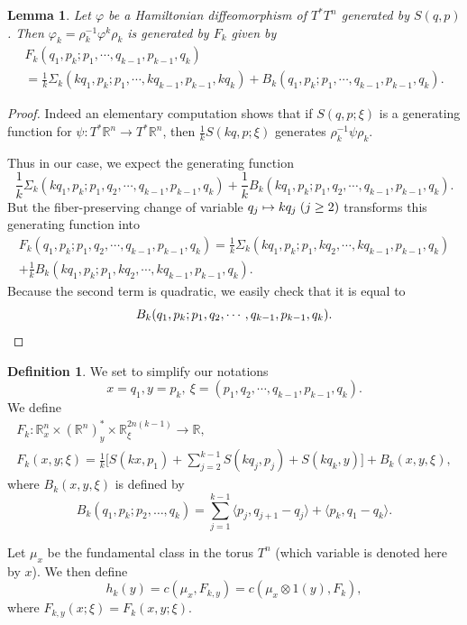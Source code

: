 \documentclass[JEP,XML,SOM,NoFloatCountersInSection,Unicode,published]{cedram}
\newcommand\mto{\mathchoice{\longmapsto}{\mapsto}{\mapsto}{\mapsto}}
\numberwithin{equation}{section}
\theoremstyle{plain}
\newtheorem{lemma}[theorem]{Lemma}
\theoremstyle{definition}
\newtheorem{definition}[theorem]{Definition}
\theoremstyle{remark}
\begin{document}
\begin{lemma}\label{Lemma-5.7}
Let $\varphi$ be a Hamiltonian diffeomorphism of $T^*T^n$ generated by $S(q,p)$. Then $\varphi_{k} =
\rho_{k}^{-1} \varphi^{k} \rho_{k}$ is generated by ${F}_{k}$ given by
\begin{multline*}
{F}_{k} (q_{1},p_{k} ; p_{1},\cdots, q_{k-1}, p_{k-1}, q_{k})\\
=\frac{1}{k}{\Sigma}_{k} (k q_{1}, p_{k} ; p_{1},\cdots, k
q_{k-1}, p_{k-1}, k q_{k})
+ {B}_{k} (q_{1}, p_{k} ; p_{1},\cdots, q_{k-1}, p_{k-1},q_{k}).
\end{multline*}
\end{lemma}
\noindent
\begin{proof} Indeed an elementary computation shows that if $S(q,p;\xi)$ is a generating function for
$\psi: T^* {\mathbb R}^n \to T^* {\mathbb R}^n$, then $\frac{1}{k} S (kq, p; \xi)$ generates $\rho^{-1}_{k} \psi \rho_{k}$.


Thus in our case, we expect the generating function
\[
\frac{1}{k} {\Sigma}_{k} (k q_{1}, p_{k} ; p_{1},
q_{2},\cdots, q_{k-1}, p_{k-1}, q_{k})
+ \frac{1}{k} {B}_{k} (k q_{1}, p_{k} ; p_{1}, q_{2},\cdots, q_{k-1},
p_{k-1}, q_{k}).
\]
But the fiber-preserving change of variable $q_{j} \mto kq_{j} \; (j\geq
2)$ transforms this generating function into
\begin{multline*}
F_{k} (q_{1}, p_{k} ; p_{1},q_{2},\cdots, q_{k-1},p_{k-1},q_{k}) =
\frac{1}{k} {\Sigma}_{k} (kq_{1}, p_{k} ; p_{1}, kq_{2},\cdots, kq_{k-1}, p_{k-1}, q_{k})\\
+ \frac{1}{k} {B}_{k} (kq_{1},p_{k}; p_{1}, k q_{2},\cdots, kq_{k-1}, p_{k-1}, q_{k}).
\end{multline*}
Because the second term is quadratic, we easily check that it is equal to
\[
{B}_{k} (q_{1},p_{k} ; p_{1}, q_{2}, \cdots, q_{k-1}, p_{k-1},
q_{k}).\qedhere
\]
\end{proof}

\begin{definition}\label{4.5} We set to simplify our notations
\[
x = q_{1}, y = p_{k},\ \xi = (p_{1}, q_{2},\cdots, q_{k-1},
p_{k-1}, q_{k}).
\]
We define
\begin{gather*}
F_k: {\mathbb R}_x^n\times ({\mathbb R}^n)_y^* \times {\mathbb R}_{\xi}^{2n(k-1)} \to {\mathbb R},\\
F_k(x,y;\xi)=
\frac{1}{k}\biggl [ S(kx,p_{1})+ \sum_{j=2}^{k-1} S(kq_{j},p_{j}) + S(kq_{k},y)\biggr ]+B_{k}(x,y,\xi),
\end{gather*}
where $B_k(x,y,\xi)$ is defined by
\[
B_k(q_1,p_k;p_2,\dots,q_k)=\sum_{j=1}^{k-1}\langle p_{j}, q_{j+1}-q_{j}\rangle + \langle p_{k},q_{1}-q_{k}\rangle.
\]

Let $\mu_x$ be the fundamental class in the torus $T^n$ (which variable is denoted here by $x$). We then define
\[
{h}_{k} (y) = c (\mu_{x}, {F}_{k,y})=c(\mu_{x} \otimes 1(y),{F}_{k}),
\]
where
${F}_{k,y} (x;\xi) = {F}_{k} (x,y; \xi)$.
\end{definition}
\end{document}
